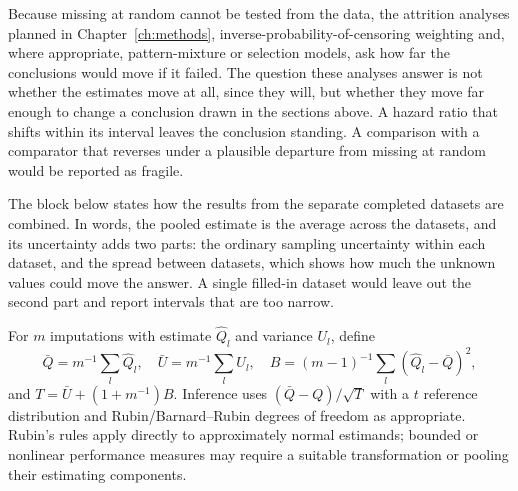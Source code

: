 Because missing at random cannot be tested from the data, the attrition analyses planned in Chapter~\ref{ch:methods}, inverse-probability-of-censoring weighting and, where appropriate, pattern-mixture or selection models, ask how far the conclusions would move if it failed. The question these analyses answer is not whether the estimates move at all, since they will, but whether they move far enough to change a conclusion drawn in the sections above. A hazard ratio that shifts within its interval leaves the conclusion standing. A comparison with a comparator that reverses under a plausible departure from missing at random would be reported as fragile.

The block below states how the results from the separate completed datasets are combined. In words, the pooled estimate is the average across the datasets, and its uncertainty adds two parts: the ordinary sampling uncertainty within each dataset, and the spread between datasets, which shows how much the unknown values could move the answer. A single filled-in dataset would leave out the second part and report intervals that are too narrow.

\begin{derivation}
\label{der:rubin}
For $m$ imputations with estimate $\widehat Q_l$ and variance $U_l$, define
\[
 \bar Q=m^{-1}\sum_l\widehat Q_l,\quad
 \bar U=m^{-1}\sum_l U_l,\quad
 B=(m-1)^{-1}\sum_l(\widehat Q_l-\bar Q)^2,
\]
and $T=\bar U+(1+m^{-1})B$. Inference uses
$(\bar Q-Q)/\sqrt T$ with a $t$ reference distribution and Rubin/Barnard--Rubin
degrees of freedom as appropriate. Rubin's rules apply directly to approximately
normal estimands; bounded or nonlinear performance measures may require a
suitable transformation or pooling their estimating components.
\end{derivation}

